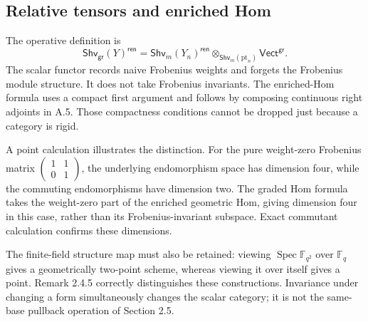 \documentclass[10pt]{article}
\begin{document}
\subsection*{Relative tensors and enriched Hom}
The operative definition is \[\mathsf{Shv}_{\mathsf{gr}}(Y)^{\mathsf{ren}}
=\mathsf{Shv}_m(Y_n)^{\mathsf{ren}}\otimes_{\mathsf{Shv}_m(\mathrm{pt}_n)}\mathsf{Vect}^{\mathsf{gr}}.\] The scalar functor records naive Frobenius weights and forgets the Frobenius module structure. It does not take Frobenius invariants. The enriched-Hom formula uses a compact first argument and follows by composing continuous right adjoints in A.5. Those compactness conditions cannot be dropped just because a category is rigid.\par
A point calculation illustrates the distinction. For the pure weight-zero Frobenius matrix \(\left(\begin{smallmatrix}1&1\\0&1\end{smallmatrix}\right)\), the underlying endomorphism space has dimension four, while the commuting endomorphisms have dimension two. The graded Hom formula takes the weight-zero part of the enriched geometric Hom, giving dimension four in this case, rather than its Frobenius-invariant subspace. Exact commutant calculation confirms these dimensions.\par
The finite-field structure map must also be retained: viewing \(\operatorname{Spec}\mathbb F_{q^2}\) over \(\mathbb F_q\) gives a geometrically two-point scheme, whereas viewing it over itself gives a point. Remark 2.4.5 correctly distinguishes these constructions. Invariance under changing a form simultaneously changes the scalar category; it is not the same-base pullback operation of Section 2.5.\par
\end{document}
